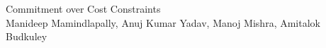 \documentclass[11pt, a4paper]{article}
\begin{document}
\onehalfspacing


\begin{center}
{\LARGE Commitment over Cost Constraints}\\
{Manideep Mamindlapally, Anuj Kumar Yadav, Manoj Mishra, Amitalok Budkuley}\\
\end{center}
\vspace{1em}










\pagebreak


\end{document}
